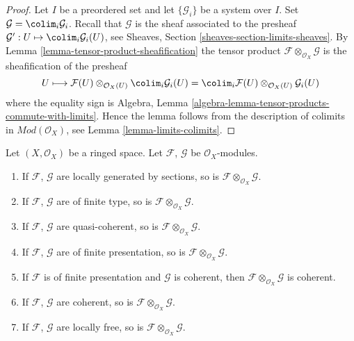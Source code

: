 \begin{proof}
Let $I$ be a preordered set and let $\{\mathcal{G}_i\}$ be
a system over $I$. Set $\mathcal{G} = \colim_i \mathcal{G}_i$.
Recall that $\mathcal{G}$ is the sheaf associated to the presheaf
$\mathcal{G}' : U \mapsto \colim_i \mathcal{G}_i(U)$, see
Sheaves, Section \ref{sheaves-section-limits-sheaves}.
By
Lemma \ref{lemma-tensor-product-sheafification}
the tensor product $\mathcal{F} \otimes_{\mathcal{O}_X} \mathcal{G}$
is the sheafification of the presheaf
$$
U \longmapsto
\mathcal{F}(U) \otimes_{\mathcal{O}_X(U)} \colim_i \mathcal{G}_i(U) =
\colim_i \mathcal{F}(U) \otimes_{\mathcal{O}_X(U)} \mathcal{G}_i(U)
$$
where the equality sign is
Algebra, Lemma \ref{algebra-lemma-tensor-products-commute-with-limits}.
Hence the lemma follows from the description of colimits in
$\textit{Mod}(\mathcal{O}_X)$, see Lemma \ref{lemma-limits-colimits}.
\end{proof}

\begin{lemma}
\label{lemma-tensor-product-permanence}
Let $(X, \mathcal{O}_X)$ be a ringed space.
Let $\mathcal{F}$, $\mathcal{G}$ be $\mathcal{O}_X$-modules.
\begin{enumerate}
\item If $\mathcal{F}$, $\mathcal{G}$ are locally generated
by sections, so is $\mathcal{F} \otimes_{\mathcal{O}_X} \mathcal{G}$.
\item If $\mathcal{F}$, $\mathcal{G}$ are of finite type,
so is $\mathcal{F} \otimes_{\mathcal{O}_X} \mathcal{G}$.
\item If $\mathcal{F}$, $\mathcal{G}$ are quasi-coherent,
so is $\mathcal{F} \otimes_{\mathcal{O}_X} \mathcal{G}$.
\item If $\mathcal{F}$, $\mathcal{G}$ are of finite presentation,
so is $\mathcal{F} \otimes_{\mathcal{O}_X} \mathcal{G}$.
\item If $\mathcal{F}$ is of finite presentation and $\mathcal{G}$ is coherent,
then $\mathcal{F} \otimes_{\mathcal{O}_X} \mathcal{G}$ is coherent.
\item If $\mathcal{F}$, $\mathcal{G}$ are coherent,
so is $\mathcal{F} \otimes_{\mathcal{O}_X} \mathcal{G}$.
\item If $\mathcal{F}$, $\mathcal{G}$ are locally free,
so is $\mathcal{F} \otimes_{\mathcal{O}_X} \mathcal{G}$.
\end{enumerate}
\end{lemma}

